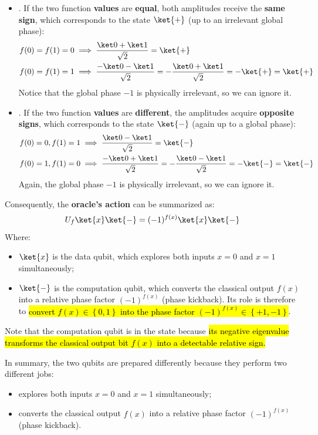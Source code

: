 \begin{itemize}
    \item {}. If the two function \textbf{values} are \textbf{equal}, both amplitudes receive the \textbf{same sign}, which corresponds to the state $\ket{+}$ (up to an irrelevant global phase):
    \begin{equation*}
        \begin{aligned}
            f(0) = f(1) = 0 &\implies \frac{\ket0+\ket1}{\sqrt2} = \ket{+} \\
            f(0) = f(1) = 1 &\implies \frac{-\ket0-\ket1}{\sqrt2} = -\frac{\ket0+\ket1}{\sqrt2} = -\ket{+} = \ket{+}
        \end{aligned}
    \end{equation*}
    Notice that the global phase $-1$ is physically irrelevant, so we can ignore it.
    \item {}. If the two function \textbf{values} are \textbf{different}, the amplitudes acquire \textbf{opposite signs}, which corresponds to the state $\ket{-}$ (again up to a global phase):
    \begin{equation*}
        \begin{aligned}
            f(0) = 0, f(1) = 1 &\implies \frac{\ket0-\ket1}{\sqrt2} = \ket{-} \\
            f(0) = 1, f(1) = 0 &\implies \frac{-\ket0+\ket1}{\sqrt2} = -\frac{\ket0-\ket1}{\sqrt2} = -\ket{-} = \ket{-}
        \end{aligned}
    \end{equation*}
    Again, the global phase $-1$ is physically irrelevant, so we can ignore it.
\end{itemize}
Consequently, the \textbf{oracle's action} can be summarized as:
\begin{equation}
    U_f \ket{x}\ket{-} = (-1)^{f(x)} \ket{x}\ket{-}
\end{equation}
Where:
\begin{itemize}
    \item $\ket{x}$ is the data qubit, which explores both inputs $x=0$ and $x=1$ simultaneously;
    \item $\ket{-}$ is the computation qubit, which converts the classical output $f(x)$ into a relative phase factor $(-1)^{f(x)}$ (phase kickback). Its role is therefore to \hl{convert $f(x) \in \left\{0,1\right\}$ into the phase factor $(-1)^{f(x)} \in \left\{+1,-1\right\}$}.
\end{itemize}
\textcolor{Green3}{} Note that the computation qubit is in the state \ket{-} because \hl{its negative eigenvalue transforms the classical output bit $f(x)$ into a detectable relative sign.}

\highspace
In summary, the two qubits are prepared differently because they perform two different jobs:
\begin{itemize}
    \item \ket{+} explores both inputs $x=0$ and $x=1$ simultaneously;
    \item \ket{-} converts the classical output $f(x)$ into a relative phase factor $(-1)^{f(x)}$ (phase kickback).
\end{itemize}
